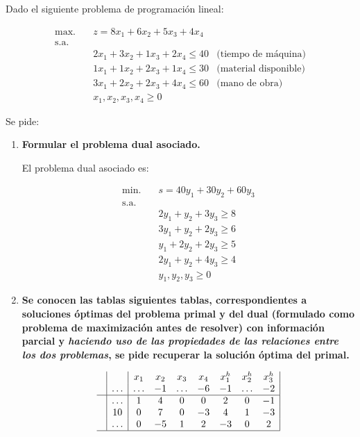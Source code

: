 Dado el siguiente problema de programación lineal:

\[
\begin{aligned}
\mbox{max.} \quad & z = 8x_1 + 6x_2 + 5x_3  + 4x_4 \\
\text{s.a.} \quad & \\
& 2x_1 + 3x_2 + 1x_3 + 2x_4 \le 40 & \text{(tiempo de máquina)} \\
& 1x_1 + 1x_2 + 2x_3 + 1x_4 \le 30 & \text{(material disponible)} \\
& 3x_1 + 2x_2 + 2x_3 + 4x_4 \le 60 & \text{(mano de obra)} \\
& x_1, x_2, x_3, x_4 \ge 0 &
\end{aligned}
\]

Se pide:
\begin{enumerate}[label=\alph*)]
    \item \textbf{Formular el problema dual asociado.}

    El problema dual asociado es:

    \[
    \begin{aligned}
    \mbox{min.}\quad & s = 40y_1 + 30y_2 + 60y_3 \\
    \text{s.a.} \quad & \\
    & 2y_1 + y_2 + 3y_3 \ge 8 \\
    & 3y_1 + y_2 + 2y_3 \ge 6 \\
    & y_1 + 2y_2 + 2y_3 \ge 5 \\
    & 2y_1 + y_2 + 4y_3 \ge 4 \\
    & y_1, y_2, y_3 \ge 0
    \end{aligned}
    \]

    \item \textbf{Se conocen las tablas siguientes tablas, correspondientes a soluciones óptimas del problema primal y del dual (formulado como problema de maximización antes de resolver) con información parcial y \textit{haciendo uso de las propiedades de las relaciones entre los dos problemas}, se pide recuperar la solución óptima del primal.}

    \[
    \begin{array}{c|c|ccccccc|}
          &        & x_1    & x_2 & x_3    & x_4 & x^h_1 & x^h_2  & x^h_3\\ 
          & \ldots & \ldots & -1  & \ldots & -6  & -1    & \ldots & -2 \\ 
    \hline
          & \ldots & 1      & 4   & 0      & 0   & 2     & 0      & -1\\ 
          & 10     & 0      & 7   & 0      & -3  & 4     & 1      & -3\\ 
          & \ldots & 0      & -5  & 1      & 2   & -3    & 0      & 2\\ 
    \hline
    \end{array}
    \]
    

\end{enumerate}
